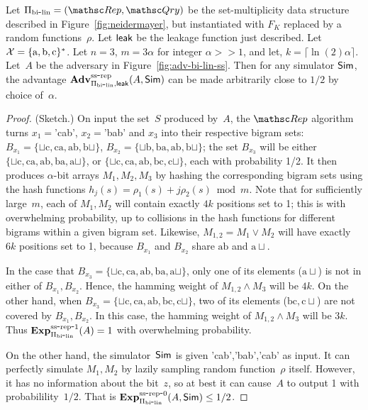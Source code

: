 \begin{theorem}\label{thm:bi-lin-ss}
Let $\setprim_{\bilin}= (\Rep, \Qry)$ be the set-multiplicity data structure described in Figure~\ref{fig:neidermayer}, but instantiated with $F_{K}$ replaced by a random functions~$\rho$.  Let ${\sf leak}$ be the leakage function just described.   Let~${\cal X}=\{\mathrm{a,b,c}\}^*$. Let $n=3$,  $m=3\alpha $ for integer $\alpha >> 1$, and let, $k = \lceil \ln(2) \alpha \rceil$.  Let~$A$ be the adversary in Figure~\ref{fig:adv-bi-lin-ss}.  Then for any simulator ${\sf Sim}$, the advantage $\mathrm{\mathbf{Adv}}^{\mathrm{ss\mbox{-}rep}}_{\Pi_{\mathrm{bi}\mbox{-}\mathrm{lin}},{\sf leak}}(A,{\sf Sim})$ can be made arbitrarily close to $1/2$ by choice of~$\alpha$.
\end{theorem}
\begin{proof}(Sketch.)
On input the set~$S$ produced by~$A$, the $\Rep$ algorithm turns $x_1=$'cab', $x_2=$'bab' and $x_3$ into their respective bigram sets: $B_{x_1}=\{\sqcup\mathrm{c},\mathrm{ca},\mathrm{ab},\mathrm{b}\sqcup\}$, $B_{x_2}=\{\sqcup\mathrm{b},\mathrm{ba},\mathrm{ab}, \mathrm{b}\sqcup \}$; the set $B_{x_3}$ will be either $\{\sqcup\mathrm{c},\mathrm{ca},\mathrm{ab},\mathrm{ba}, \mathrm{a}\sqcup\}$, or $\{\sqcup\mathrm{c},\mathrm{ca},\mathrm{ab},\mathrm{bc}, \mathrm{c}\sqcup\}$, each with probability 1/2.  It then produces $\alpha$-bit arrays $M_1, M_2, M_3$ by hashing the corresponding bigram sets using the hash functions $h_j(s)=\rho_1(s)+ j\rho_2(s) \bmod m$.  Note that for sufficiently large~$m$, each of $M_1,M_2$ will contain exactly $4k$ positions set to 1; this is with overwhelming probability, up to collisions in the hash functions for different bigrams within a given bigram set.  Likewise, $M_{1,2}=M_1 \vee M_2$ will have exactly $6k$ positions set to 1, because $B_{x_1}$ and $B_{x_2}$ share $\mathrm{ab}$ and $\mathrm{a}\sqcup$.

In the case that $B_{x_3}=\{\sqcup\mathrm{c},\mathrm{ca},\mathrm{ab},\mathrm{ba}, \mathrm{a}\sqcup\}$, only one of its elements ($\mathrm{a}\sqcup$) is not in either of $B_{x_1},B_{x_2}$.  Hence, the hamming weight of $M_{1,2}\wedge M_3$ will be $4k$.  On the other hand, when $B_{x_3} = \{\sqcup\mathrm{c},\mathrm{ca},\mathrm{ab},\mathrm{bc}, \mathrm{c}\sqcup\}$, two of its elements ($\mathrm{bc}, \mathrm{c}\sqcup$) are not covered by $B_{x_1},B_{x_2}$.  In this case, the hamming weight of $M_{1,2} \wedge M_3$ will be $3k$.  Thus $\mathrm{\mathbf{Exp}}^{\mathrm{ss\mbox{-}rep\mbox{-}1}}_{\Pi_{\mathrm{bi}\mbox{-}\mathrm{lin}}}(A)=1$ with overwhelming probability.  

On the other hand, the simulator~${\sf Sim}$ is given 'cab','bab','cab' as
input.  It can perfectly simulate $M_1,M_2$ by lazily sampling random
function~$\rho$ itself.  However, it has no information about the
bit~$z$, so at best it can cause~$A$ to output 1 with
probabilility~$1/2$.  That is $\mathrm{\mathbf{Exp}}^{\mathrm{ss\mbox{-}rep\mbox{-}0}}_{\Pi_{\mathrm{bi}\mbox{-}\mathrm{lin}}}(A,{\sf Sim}) \leq 1/2$.
\end{proof}




